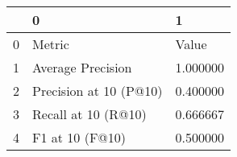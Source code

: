\begin{tabular}{lll}
\toprule
 & 0 & 1 \\
\midrule
0 & Metric & Value \\
1 & Average Precision & 1.000000 \\
2 & Precision at 10 (P@10) & 0.400000 \\
3 & Recall at 10 (R@10) & 0.666667 \\
4 & F1 at 10 (F@10) & 0.500000 \\
\bottomrule
\end{tabular}
